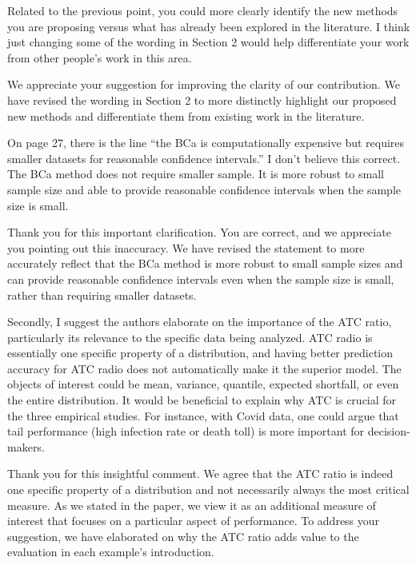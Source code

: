 \documentclass[12pt]{journalrebuttal}
\begin{document}
\begin{revcomment}
    Related to the previous point, you could more clearly identify the new methods you are proposing versus what has already been explored in the literature. I think just changing some of the wording in Section 2 would help differentiate your work from other people's work in this area.
\end{revcomment}
\begin{response}
    We appreciate your suggestion for improving the clarity of our contribution. We have revised the wording in Section 2 to more distinctly highlight our proposed new methods and differentiate them from existing work in the literature.
\end{response}

\begin{revcomment}
On page 27, there is the line \enquote{the BCa is computationally expensive but requires smaller datasets for reasonable confidence intervals.} I don't believe this correct. The BCa method does not require smaller sample. It is more robust to small sample size and able to provide reasonable confidence intervals when the sample size is small.
\end{revcomment}
\begin{response}
    Thank you for this important clarification. You are correct, and we appreciate you pointing out this inaccuracy. We have revised the statement to more accurately reflect that the BCa method is more robust to small sample sizes and can provide reasonable confidence intervals even when the sample size is small, rather than requiring smaller datasets. 
\end{response}


\nextreviewer

\begin{revcomment}
    Secondly, I suggest the authors elaborate on the importance of the ATC ratio, particularly its relevance to the specific data being analyzed. ATC radio is essentially one specific property of a distribution, and having better prediction accuracy for ATC radio does not automatically make it the superior model. The objects of interest could be mean, variance, quantile, expected shortfall, or even the entire distribution. It would be beneficial to explain why ATC is crucial for the three empirical studies. For instance, with Covid data, one could argue that tail performance (high infection rate or death toll) is more important for decision-makers.
\end{revcomment}
\begin{response}
    Thank you for this insightful comment. We agree that the ATC ratio is indeed one specific property of a distribution and not necessarily always the most critical measure. As we stated in the paper, we view it as an additional measure of interest that focuses on a particular aspect of performance. To address your suggestion, we have elaborated on why the ATC ratio adds value to the evaluation in each example's introduction.
\end{response}
\end{document}
